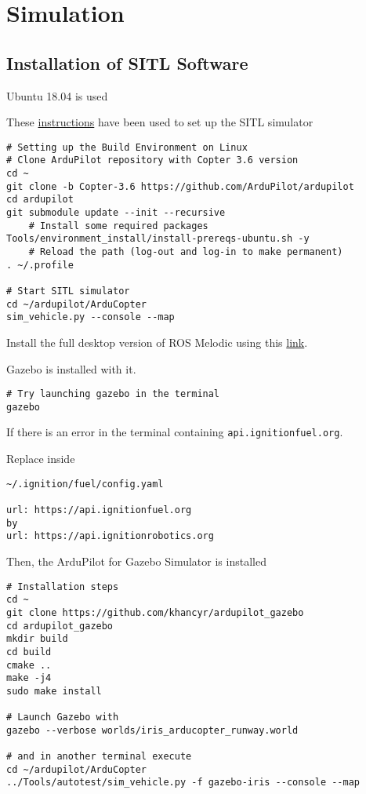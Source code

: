 \section{Simulation}

\subsection{Installation of SITL Software}
Ubuntu 18.04 is used

These \href{http://ardupilot.org/dev/docs/setting-up-sitl-on-linux.html}{instructions} have been used to set up the SITL simulator

\begin{verbatim}
# Setting up the Build Environment on Linux
# Clone ArduPilot repository with Copter 3.6 version
cd ~
git clone -b Copter-3.6 https://github.com/ArduPilot/ardupilot
cd ardupilot
git submodule update --init --recursive
    # Install some required packages
Tools/environment_install/install-prereqs-ubuntu.sh -y
    # Reload the path (log-out and log-in to make permanent)
. ~/.profile

# Start SITL simulator
cd ~/ardupilot/ArduCopter
sim_vehicle.py --console --map
\end{verbatim}

Install the full desktop version of ROS Melodic using this \href{http://wiki.ros.org/melodic/Installation/Ubuntu}{link}.

Gazebo is installed with it.

\begin{verbatim}
# Try launching gazebo in the terminal
gazebo
            \end{verbatim}

If there is an error in the terminal containing \texttt{api.ignitionfuel.org}.

Replace inside
\begin{verbatim}
~/.ignition/fuel/config.yaml

url: https://api.ignitionfuel.org
by
url: https://api.ignitionrobotics.org
\end{verbatim}

Then, the ArduPilot for Gazebo Simulator is installed
\begin{verbatim}
# Installation steps
cd ~
git clone https://github.com/khancyr/ardupilot_gazebo
cd ardupilot_gazebo
mkdir build
cd build
cmake ..
make -j4
sudo make install

# Launch Gazebo with
gazebo --verbose worlds/iris_arducopter_runway.world

# and in another terminal execute
cd ~/ardupilot/ArduCopter
../Tools/autotest/sim_vehicle.py -f gazebo-iris --console --map
\end{verbatim}

